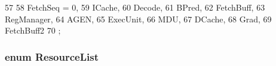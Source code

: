 \begin{DoxyCode}
57                     {
58        FetchSeq = 0,
59        ICache,
60        Decode,
61        BPred,
62        FetchBuff,
63        RegManager,
64        AGEN,
65        ExecUnit,
66        MDU,
67        DCache,
68        Grad,
69        FetchBuff2
70     };
\end{DoxyCode}
\hypertarget{namespaceThePipeline_a20c49520a50d0b1ad56baad8ba94d3d1}{
\subsubsection[{ResourceList}]{\setlength{\rightskip}{0pt plus 5cm}enum {\bf ResourceList}}}
\label{namespaceThePipeline_a20c49520a50d0b1ad56baad8ba94d3d1}
